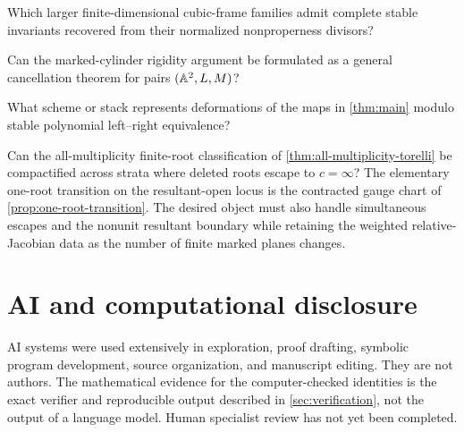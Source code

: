 \documentclass[11pt,reqno]{amsart}
\begin{document}
\begin{question}
Which larger finite-dimensional cubic-frame families admit complete stable
invariants recovered from their normalized nonproperness divisors?
\end{question}

\begin{question}
Can the marked-cylinder rigidity argument be formulated as a general
cancellation theorem for pairs \((\mathbb A^2,L,M)\)?
\end{question}

\begin{question}
What scheme or stack represents deformations of the maps in
\cref{thm:main} modulo stable polynomial left--right equivalence?
\end{question}

\begin{question}
\label{q:compactified-stable-moduli}
Can the all-multiplicity finite-root classification of
\cref{thm:all-multiplicity-torelli} be compactified across strata where
deleted roots escape to \(c=\infty\)?  The elementary one-root transition
on the resultant-open locus is the contracted gauge chart of
\cref{prop:one-root-transition}.  The desired object must also handle
simultaneous escapes and the nonunit resultant boundary while retaining the
weighted relative-Jacobian data as the number of finite marked planes
changes.
\end{question}

\appendix






\section*{AI and computational disclosure}

AI systems were used extensively in exploration, proof drafting, symbolic
program development, source organization, and manuscript editing.  They are
not authors.  The mathematical evidence for the computer-checked identities
is the exact verifier and reproducible output described in
\cref{sec:verification}, not the output of a language model.  Human
specialist review has not yet been completed.



\end{document}
